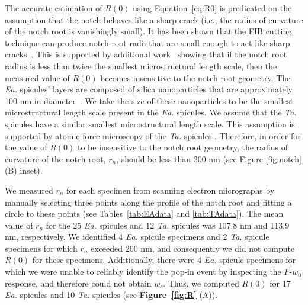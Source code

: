 \documentclass[12pt,onecolumn]{article}
\makeatletter
\newcommand{\TA}{\textit{Ta.\@}\xspace}
\newcommand{\EA}{\textit{Ea.\@}\xspace}
\makeatother
\begin{document}
\begin{bibunit}
The accurate estimation of $R(0)$ using Equation~\eqref{eq:R0} is predicated on the assumption that the notch behaves like a sharp crack (i.e., the radius of curvature of the notch root is vanishingly small). It has been shown that the FIB cutting technique can produce notch root radii that are small enough to act like sharp cracks~\cite{fett2008fracture}. This is supported by additional work~\cite{kubler1997fracture} showing that if the notch root radius is less than twice the smallest microstructural length scale, then the measured value of $R(0)$ becomes insensitive to the notch root geometry. The \EA spicules' layers are composed of silica nanoparticles that are approximately 100 nm in diameter~\cite{aizenberg2005skeleton}. We take the size of these nanoparticles to be the smallest microstructural length scale present in the \EA spicules. We assume that the \TA spicules have a similar smallest microstructural length scale. This assumption is supported by atomic force microscopy of the \TA spicules \cite{weaver2003nanostructural}. Therefore, in order for the value of $R(0)$ to be insensitive to the notch root geometry, the radius of curvature of the notch root, $r_n$, should be less than 200 nm (see Figure \ref{fig:notch} (B) inset). 

We measured $r_n$ for each specimen from scanning electron micrographs by manually selecting three points along the profile of the notch root and fitting a circle to these points (see Tables~\ref{tab:EAdata} and \ref{tab:TAdata}). The mean value of $r_n$ for the 25 \EA spicules and 12 \TA spicules was 107.8 nm and 113.9 nm, respectively. We identified 4 \EA spicule specimens and 2 \TA spicule specimens for which $r_n$ exceeded 200 nm, and consequently we did not compute $R(0)$ for these specimens. Additionally, there were 4 \EA spicule specimens for which we were unable to reliably identify the pop-in event by inspecting the $F$-$w_0$ response, and therefore could not obtain $w_c$. Thus, we computed $R(0)$ for 17 \EA spicules and 10 \TA spicules (see {\bf Figure~\ref{fig:R}} (A)).


\end{bibunit}
\end{document}
